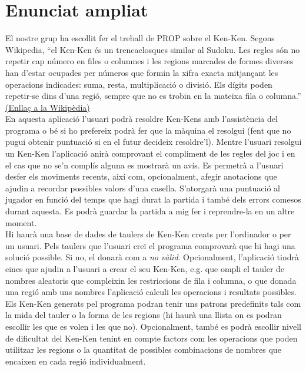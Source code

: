 \documentclass[a4paper,12pt]{article}
\begin{document}


\newpage

\section{Enunciat ampliat}


El nostre grup ha escollit fer el treball de PROP sobre el Ken-Ken. Segons Wikipedia, ``el Ken-Ken és un trencaclosques similar al Sudoku.
 Les regles són no repetir cap número en files o columnes i les regions marcades de formes diverses han 
 d'estar ocupades per números que formin la xifra exacta mitjançant les operacions indicades: suma, 
 resta, multiplicació o divisió. Els dígits poden repetir-se dins d'una regió, sempre que no es trobin 
 en la mateixa fila o columna.''
\href{https://ca.wikipedia.org/wiki/Kenken}{(Enllaç a la Wikipèdia)}
\\


En aquesta aplicació l'usuari podrà resoldre Ken-Kens amb l'assistència del programa o bé si ho prefereix podrà fer que la màquina el resolgui (fent que no pugui obtenir puntuació si en el futur decideix resoldre'l). Mentre l'usuari resolgui un Ken-Ken l'aplicació anirà comprovant el compliment de les regles del joc i en el cas que no se'n complís alguna es mostrarà un avís. Es permetrà a l'usuari desfer els moviments recents, així com, opcionalment, afegir anotacions que ajudin a recordar possibles valors d'una casella. S'atorgarà una puntuació al jugador en funció del temps que hagi durat la partida i també dels errors comesos durant aquesta. Es podrà guardar la partida a mig fer i reprendre-la en un altre moment.
\\


Hi haurà una base de dades de taulers de Ken-Ken creats per l'ordinador o per un usuari. Pels taulers que l'usuari creï el programa comprovarà que hi hagi una solució possible. Si no, el donarà com a \emph{no vàlid}. Opcionalment, l'aplicació tindrà eines que ajudin a l'usuari a crear el seu Ken-Ken, e.g. que ompli el tauler de nombres aleatoris que compleixin les restriccions de fila i columna, o que donada una regió amb uns nombres l'aplicació calculi les operacions i resultats possibles. Els Ken-Ken generats pel programa podran tenir uns patrons predefinits tals com la mida del tauler o la forma de les regions (hi haurà una llista on es podran escollir les que es volen i les que no). Opcionalment, també es podrà escollir nivell de dificultat del Ken-Ken tenint en compte factors com les operacions que poden utilitzar les regions o la quantitat de possibles combinacions de nombres que encaixen en cada regió individualment.
\\
\end{document}
